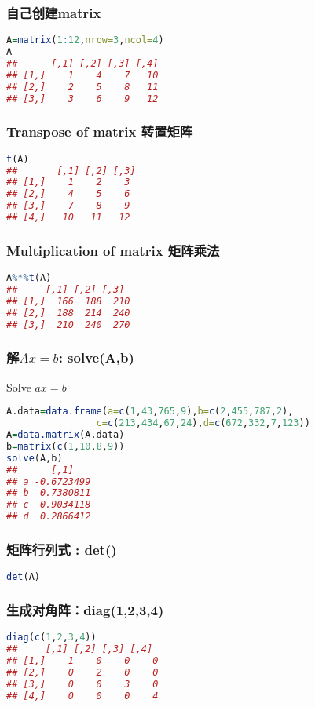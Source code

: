 \documentclass[11pt,a4paper]{article}
\begin{document}
\subsubsection{自己创建matrix}
\begin{lstlisting}[language=R]
A=matrix(1:12,nrow=3,ncol=4)
A
##      [,1] [,2] [,3] [,4]
## [1,]    1    4    7   10
## [2,]    2    5    8   11
## [3,]    3    6    9   12
\end{lstlisting}
\subsubsection{Transpose of matrix 转置矩阵}
\begin{lstlisting}[language=R]
t(A)
##       [,1] [,2] [,3]
## [1,]    1    2    3
## [2,]    4    5    6
## [3,]    7    8    9
## [4,]   10   11   12
\end{lstlisting}
\subsubsection{Multiplication of matrix 矩阵乘法}
\begin{lstlisting}[language=R]
A%*%t(A)
##     [,1] [,2] [,3]
## [1,]  166  188  210
## [2,]  188  214  240
## [3,]  210  240  270
\end{lstlisting}
\subsubsection{解$Ax=b$: solve(A,b)}
Solve $ax=b$
\begin{lstlisting}[language=R]
A.data=data.frame(a=c(1,43,765,9),b=c(2,455,787,2),
                c=c(213,434,67,24),d=c(672,332,7,123))
A=data.matrix(A.data)
b=matrix(c(1,10,8,9))
solve(A,b)
##      [,1]
## a -0.6723499
## b  0.7380811
## c -0.9034118
## d  0.2866412
\end{lstlisting}

\subsubsection{矩阵行列式 : det()}
\begin{lstlisting}[language=R]
det(A)
\end{lstlisting}
\subsubsection{生成对角阵：diag(1,2,3,4)}
\begin{lstlisting}[language=R]
diag(c(1,2,3,4))
##     [,1] [,2] [,3] [,4]
## [1,]    1    0    0    0
## [2,]    0    2    0    0
## [3,]    0    0    3    0
## [4,]    0    0    0    4
\end{lstlisting}
\end{document}

